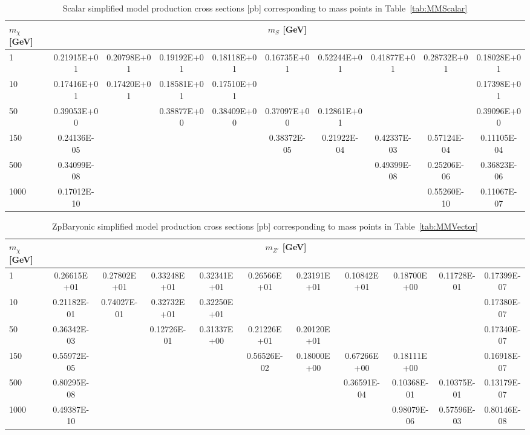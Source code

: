 \begin{sidewaystable*}[htbH]
\begin{adjustbox}{width=\textwidth,totalheight=\textheight,keepaspectratio}
\label{tab:scalarxsecs}
\begin{tabular}{l | c | c | c | c | c | c | c | c | c}
\hline 
$m_\chi$ [GeV] & \multicolumn{9}{c}{$m_{S}$ [GeV]} \\ 
\hline
1 & 0.21915E+01 & 0.20798E+01 & 0.19192E+01 & 0.18118E+01 & 0.16735E+01 & 0.52244E+01 & 0.41877E+01 & 0.28732E+01 & 0.18028E+01\\
10 & 0.17416E+01 & 0.17420E+01 & 0.18581E+01 & 0.17510E+01 & & & & & 0.17398E+01\\
50 & 0.39053E+00 & & 0.38877E+00 & 0.38409E+00 & 0.37097E+00 & 0.12861E+01 & & & 0.39096E+00\\
150 & 0.24136E-05 & & & & 0.38372E-05 & 0.21922E-04 & 0.42337E-03 & 0.57124E-04 & 0.11105E-04\\
500 & 0.34099E-08 & & & & & & 0.49399E-08 & 0.25206E-06 & 0.36823E-06\\
1000 & 0.17012E-10 & & & & & & & 0.55260E-10 & 0.11067E-07\\
\hline
\end{tabular}
\end{adjustbox}
\caption{Scalar simplified model production cross sections [pb] corresponding to mass points in Table~\ref{tab:MMScalar}}
\end{sidewaystable*}

\begin{sidewaystable*}[htbH]
\begin{adjustbox}{width=\textwidth,totalheight=\textheight,keepaspectratio}
\label{tab:zpbaryonicxsecs}
\begin{tabular}{l | c | c | c | c | c | c | c | c | c | c}
\hline 
$m_\chi$ [GeV] & \multicolumn{10}{c}{$m_{Z'}$ [GeV]} \\ 
\hline
1 & 0.26615E+01 & 0.27802E+01 & 0.33248E+01 & 0.32341E+01 & 0.26566E+01 & 0.23191E+01 & 0.10842E+01 & 0.18700E+00 & 0.11728E-01 & 0.17399E-07\\
10 & 0.21182E-01 & 0.74027E-01 & 0.32732E+01 & 0.32250E+01 & & & & & & 0.17380E-07\\
50 & 0.36342E-03 & & 0.12726E-01 & 0.31337E+00  & 0.21226E+01 & 0.20120E+01 & & & & 0.17340E-07\\
150 & 0.55972E-05 & & & & 0.56526E-02 & 0.18000E+00 & 0.67266E+00 & 0.18111E+00 & & 0.16918E-07\\
500 & 0.80295E-08 & & & & & & 0.36591E-04 & 0.10368E-01 & 0.10375E-01 & 0.13179E-07\\
1000 & 0.49387E-10 & & & & & & & 0.98079E-06 & 0.57596E-03 & 0.80146E-08\\
\hline
\end{tabular}
\end{adjustbox}
\caption{ZpBaryonic simplified model production cross sections [pb] corresponding to mass points in Table~\ref{tab:MMVector}}
\end{sidewaystable*}


